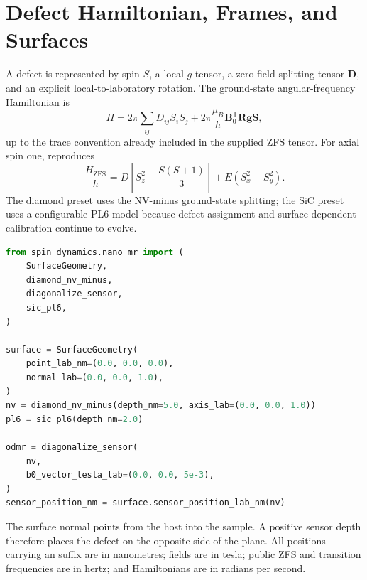 
\section{Defect Hamiltonian, Frames, and Surfaces}

A defect is represented by spin \(S\), a local \(g\) tensor, a zero-field
splitting tensor \(\mathbf{D}\), and an explicit local-to-laboratory rotation.
The ground-state angular-frequency Hamiltonian is
\[
  H =
  2\pi\sum_{ij} D_{ij} S_i S_j
  + 2\pi\frac{\mu_B}{h}
    \mathbf{B}_0^{\mathsf T}\mathbf{R}\mathbf{g}\mathbf{S},
\]
up to the trace convention already included in the supplied ZFS tensor.
For axial spin one,  reproduces
\[
  \frac{H_\mathrm{ZFS}}{h}
  =D\left[S_z^2-\frac{S(S+1)}{3}\right]
   +E(S_x^2-S_y^2).
\]
The diamond preset uses the NV-minus ground-state splitting; the SiC preset
uses a configurable PL6 model because defect assignment and surface-dependent
calibration continue to evolve.

\begin{lstlisting}[language=Python]
from spin_dynamics.nano_mr import (
    SurfaceGeometry,
    diamond_nv_minus,
    diagonalize_sensor,
    sic_pl6,
)

surface = SurfaceGeometry(
    point_lab_nm=(0.0, 0.0, 0.0),
    normal_lab=(0.0, 0.0, 1.0),
)
nv = diamond_nv_minus(depth_nm=5.0, axis_lab=(0.0, 0.0, 1.0))
pl6 = sic_pl6(depth_nm=2.0)

odmr = diagonalize_sensor(
    nv,
    b0_vector_tesla_lab=(0.0, 0.0, 5e-3),
)
sensor_position_nm = surface.sensor_position_lab_nm(nv)
\end{lstlisting}

The surface normal points from the host into the sample. A positive sensor
depth therefore places the defect on the opposite side of the plane. All
positions carrying an  suffix are in nanometres; fields are in
tesla; public ZFS and transition frequencies are in hertz; and Hamiltonians are
in radians per second.

